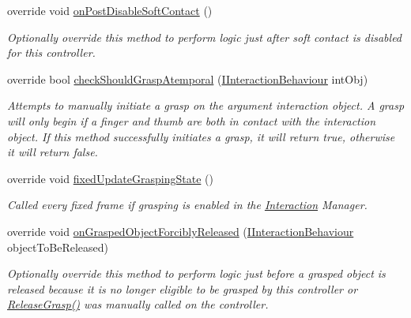 \begin{DoxyCompactItemize}
override void \mbox{\hyperlink{class_leap_1_1_unity_1_1_interaction_1_1_interaction_hand_abeba3757a254063269d0a417ac0611d0}{on\+Post\+Disable\+Soft\+Contact}} ()
\begin{DoxyCompactList}\small\item\em Optionally override this method to perform logic just after soft contact is disabled for this controller. \end{DoxyCompactList}\item 
override bool \mbox{\hyperlink{class_leap_1_1_unity_1_1_interaction_1_1_interaction_hand_a278a920f19b3a940628ddf08c502c7e0}{check\+Should\+Grasp\+Atemporal}} (\mbox{\hyperlink{interface_leap_1_1_unity_1_1_interaction_1_1_i_interaction_behaviour}{I\+Interaction\+Behaviour}} int\+Obj)
\begin{DoxyCompactList}\small\item\em Attempts to manually initiate a grasp on the argument interaction object. A grasp will only begin if a finger and thumb are both in contact with the interaction object. If this method successfully initiates a grasp, it will return true, otherwise it will return false. \end{DoxyCompactList}\item 
override void \mbox{\hyperlink{class_leap_1_1_unity_1_1_interaction_1_1_interaction_hand_a899637eb040f88fa2cac4b27e4113684}{fixed\+Update\+Grasping\+State}} ()
\begin{DoxyCompactList}\small\item\em Called every fixed frame if grasping is enabled in the \mbox{\hyperlink{namespace_leap_1_1_unity_1_1_interaction}{Interaction}} Manager. \end{DoxyCompactList}\item 
override void \mbox{\hyperlink{class_leap_1_1_unity_1_1_interaction_1_1_interaction_hand_a1506a0d6e49010aedb6a8fe5a528d4fe}{on\+Grasped\+Object\+Forcibly\+Released}} (\mbox{\hyperlink{interface_leap_1_1_unity_1_1_interaction_1_1_i_interaction_behaviour}{I\+Interaction\+Behaviour}} object\+To\+Be\+Released)
\begin{DoxyCompactList}\small\item\em Optionally override this method to perform logic just before a grasped object is released because it is no longer eligible to be grasped by this controller or \mbox{\hyperlink{class_leap_1_1_unity_1_1_interaction_1_1_interaction_controller_a3468a89e21c685d6df962ce70684c92f}{Release\+Grasp()}} was manually called on the controller. \end{DoxyCompactList}\item 

\end{DoxyCompactItemize}
